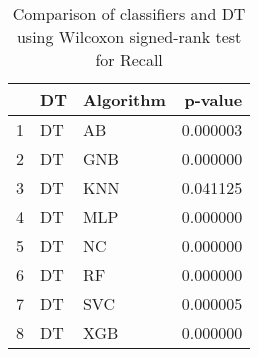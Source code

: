 \begin{table}
\footnotesize
\caption{Comparison of classifiers and DT using Wilcoxon signed-rank test for Recall}
\label{tab:DT wilcoxon Recall comparison}
\begin{tabular}{lllr}
\hline
 & DT & Algorithm & p-value \\
\hline
1 & DT & AB & 0.000003 \\
2 & DT & GNB & 0.000000 \\
3 & DT & KNN & 0.041125 \\
4 & DT & MLP & 0.000000 \\
5 & DT & NC & 0.000000 \\
6 & DT & RF & 0.000000 \\
7 & DT & SVC & 0.000005 \\
8 & DT & XGB & 0.000000 \\
\hline
\end{tabular}
\end{table}
